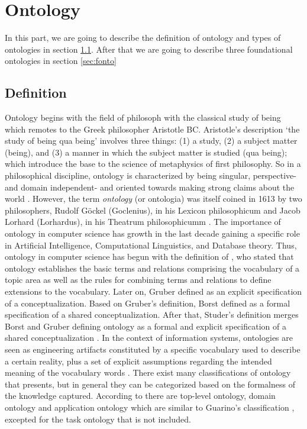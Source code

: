 \chapter{Ontology}
In this part, we are going to describe the definition of ontology and types of ontologies in section \ref{sec:def}. After that we are going to describe three foundational ontologies in section \ref{sec:fonto} 
\section{Definition}
\label{sec:def}
Ontology begins with the field of philosoph with the classical study of being which remotes to the Greek philosopher Aristotle BC. Aristotle's description ‘the study of being qua being’ involves three things: (1) a study, (2) a subject matter (being), and (3) a manner in which the subject matter is studied (qua being); which introduce the base to the science of metaphysics of first philosophy. So in a philosophical discipline, ontology is characterized by being singular, perspective- and domain independent- and oriented towards making strong claims about the world \citet{orstrom:2005}. However, the term \emph{ontology} (or ontologia) was itself coined in 1613 by two philosophers, Rudolf Göckel (Goclenius), in his Lexicon philosophicum and Jacob Lorhard (Lorhardus), in his Theatrum philosophicumm \citet{smith:2001} .
The importance of ontology in computer science has growth in the last decade gaining a specific role in Artificial Intelligence, Computational Linguistics, and Database theory. Thus, ontology in computer science has begun with the definition of \citet{neches:1991}, who stated that ontology establishes the basic terms and relations comprising the vocabulary of a topic area as well as the rules for combining terms and relations to define extensions to the vocabulary. Later on, Gruber \citeyearpar{gruber:93} defined as an explicit specification of a conceptualization. Based on Gruber’s definition, Borst \citeyearpar{borst:97} defined as a formal specification of a shared conceptualization. After that, Studer's definition merges Borst and Gruber defining ontology as a formal and explicit specification of a shared conceptualization \citet{studer:98}. In the context of information systems, ontologies are seen as engineering artifacts constituted by a specific vocabulary used to describe a certain reality, plus a set of explicit assumptions regarding the intended meaning of the vocabulary words \cite{guarino:1998}. 
There exist many classifications of ontology that \citet{gomez:2004} presents, but in general they can be categorized based on the formalness of the knowledge captured. According to \citet{baade:2003} there are top-level ontology, domain ontology and application ontology which are similar to Guarino's classification \citeyearpar{guarino:1998}, excepted for the task ontology that is not included.

